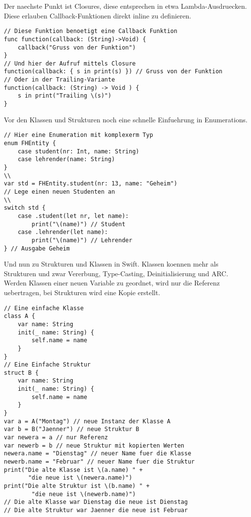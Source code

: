 Der naechste Punkt ist Closures, diese entsprechen in etwa Lambda-Ausdruecken. Diese erlauben Callback-Funktionen direkt inline zu definieren.
\begin{lstlisting}
// Diese Funktion benoetigt eine Callback Funktion
func function(callback: (String)->Void) {
	callback("Gruss von der Funktion")
}
// Und hier der Aufruf mittels Closure
function(callback: { s in print(s) }) // Gruss von der Funktion
// Oder in der Trailing-Variante
function(callback: (String) -> Void ) {
	s in print("Trailing \(s)")
}
\end{lstlisting}
Vor den Klassen und  Strukturen noch eine schnelle Einfuehrung in  Enumerations.
\begin{lstlisting}
// Hier eine Enumeration mit komplexerm Typ
enum FHEntity {
    case student(nr: Int, name: String) 
    case lehrender(name: String)
}
\\
var std = FHEntity.student(nr: 13, name: "Geheim") 
// Lege einen neuen Studenten an
\\
switch std {
    case .student(let nr, let name):
        print("\(name)") // Student
    case .lehrender(let name):
        print("\(name)") // Lehrender
} // Ausgabe Geheim
\end{lstlisting}
Und nun zu Strukturen und Klassen in Swift. Klassen koennen mehr als Strukturen und zwar Vererbung, Type-Casting, Deinitialisierung und ARC. Werden Klassen einer neuen Variable zu geordnet, wird nur die Referenz uebertragen, bei Strukturen wird eine Kopie erstellt.
\begin{lstlisting}
// Eine einfache Klasse
class A {
    var name: String
    init(_ name: String) {
        self.name = name
    }
}
// Eine Einfache Struktur
struct B {
    var name: String
    init(_ name: String) {
        self.name = name
    }
}
var a = A("Montag") // neue Instanz der Klasse A
var b = B("Jaenner") // neue Struktur B
var newera = a // nur Referenz
var newerb = b // neue Struktur mit kopierten Werten
newera.name = "Dienstag" // neuer Name fuer die Klasse
newerb.name = "Februar" // neuer Name fuer die Struktur
print("Die alte Klasse ist \(a.name) " +
       "die neue ist \(newera.name)")
print("Die alte Struktur ist \(b.name) " +
        "die neue ist \(newerb.name)")
// Die alte Klasse war Dienstag die neue ist Dienstag
// Die alte Struktur war Jaenner die neue ist Februar
\end{lstlisting}
